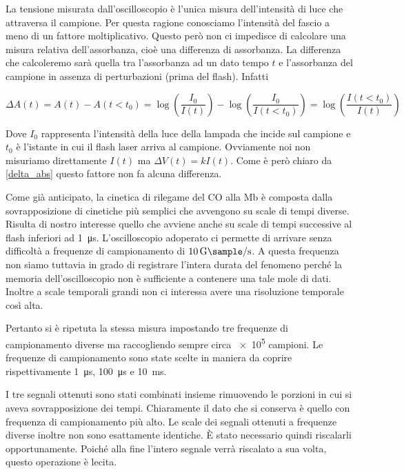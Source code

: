 \documentclass[11pt, a4paper]{article}
\begin{document}
La tensione misurata dall'oscilloscopio è l'unica misura dell'intensità di luce che attraversa il campione.
Per questa ragione conosciamo l'intensità del fascio a meno di un fattore moltiplicativo.
Questo però non ci impedisce di calcolare una misura relativa dell'assorbanza, cioè una differenza di assorbanza.
La differenza che calcoleremo sarà quella tra l'assorbanza ad un dato tempo $t$ e l'assorbanza del campione in assenza di perturbazioni (prima del flash).
Infatti

\begin{equation}
    \Delta A(t) = A(t) - A(t < t_0) = \log\left(\frac{I_0}{I(t)}\right) - \log\left(\frac{I_0}{I(t < t_0)}\right) =
    \log\left(\frac{I(t < t_0)}{I(t)}\right)
    \label{delta_abs}
\end{equation}

Dove $I_0$ rappresenta l'intensità della luce della lampada che incide sul campione e $t_0$ è l'istante in cui il flash laser arriva al campione.
Ovviamente noi non misuriamo direttamente $I(t)$ ma $\Delta V(t) = k I(t)$. Come è però chiaro da \eqref{delta_abs} questo fattore non fa alcuna differenza.

Come già anticipato, la cinetica di rilegame del CO alla Mb è composta dalla sovrapposizione di cinetiche più semplici che avvengono su scale di tempi diverse. Risulta di nostro interesse quello che avviene
anche su scale di tempi successive al flash inferiori ad \qty{1}{\micro\s}. L'oscilloscopio adoperato ci permette di arrivare senza difficoltà a frequenze di campionamento di $\qty{10}{\giga\sample \per \second}$.
A questa frequenza non siamo tuttavia in grado di registrare l'intera durata del fenomeno perché la memoria dell'oscilloscopio non è sufficiente a contenere una tale mole di dati. Inoltre a scale temporali grandi
non ci interessa avere una risoluzione temporale così alta.

Pertanto si è ripetuta la stessa misura impostando tre frequenze di campionamento diverse ma raccogliendo sempre circa \num{e5} campioni.
Le frequenze di campionamento sono state scelte in maniera da coprire rispettivamente \qty{1}{\micro\second}, \qty{100}{\micro\second} e \qty{10}{\milli\second}.

I tre segnali ottenuti sono stati combinati insieme rimuovendo le porzioni in cui si aveva sovrapposizione dei tempi.
Chiaramente il dato che si conserva è quello con frequenza di campionamento più alto. Le scale dei segnali ottenuti a frequenze diverse inoltre non sono esattamente identiche.
È stato necessario quindi riscalarli opportunamente. Poiché alla fine l'intero segnale verrà riscalato a sua volta, questo operazione è lecita.
\end{document}
